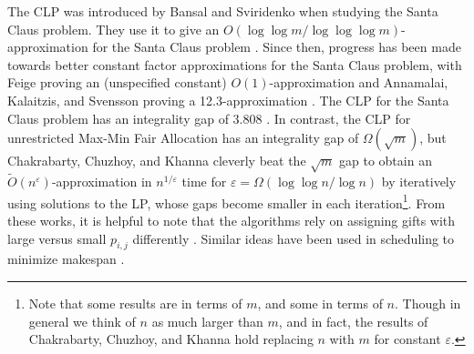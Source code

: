 The CLP was introduced by Bansal and Sviridenko when studying the Santa Claus problem. 
They use it to give an $O(\log \log m / \log \log \log m)$- approximation for the Santa Claus problem  \cite{SantaClaus-BansalSviridenko-STOC2006}. 
Since then, progress has been made towards better constant factor approximations for the Santa Claus problem, 
with Feige proving an (unspecified constant) $O(1)$-approximation and Annamalai, Kalaitzis, and Svensson proving 
a 12.3-approximation \cite{ConstantIntegralityGapSantaClaus-Feige-SODA2008, AlgoForSantaClaus-AnnamalaiKalaitzisSvenssonSODA15}.
The CLP for the Santa Claus problem has an integrality gap of $3.808$ \cite{CM19}. 
In contrast, the CLP for unrestricted Max-Min Fair Allocation has an integrality gap of $\Omega(\sqrt{m})$, but
Chakrabarty, Chuzhoy, and Khanna cleverly beat the $\sqrt{m}$ gap to obtain an $\tilde{O}(n^{\varepsilon})$-approximation 
in $n^{1/\varepsilon}$ time for $\varepsilon =\Omega \left (  \log \log n / \log n \right )$
by iteratively using solutions to the LP, 
whose gaps become smaller in each iteration\footnote{
Note that some results are in terms of $m$, and some in terms of $n$. Though in general
we think of $n$ as much larger than $m$, and in fact, 
the results of Chakrabarty, Chuzhoy, and Khanna hold replacing $n$ with $m$ for constant $\varepsilon.$
}. 
From these works, it is helpful to note that 
the algorithms rely on assigning gifts with large versus small $p_{i,j}$
differently \cite{AlgoForSantaClaus-AnnamalaiKalaitzisSvenssonSODA15,MaxMinFairAllocation-ChakrabartyChuzhoyKhannaFOCS09}. 
Similar ideas have been used in scheduling to minimize makespan \cite{MakespanScheduling-Svensson-STOC11, SchedulingUnrelatedParallelMachines-LenstraShmoysTardos-FOCS87}.


